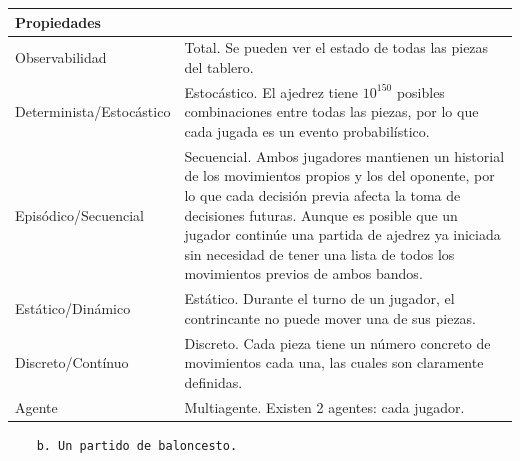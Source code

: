 \documentclass[11pt]{article}
\begin{document}
\begin{longtable}[]{@{}
  >{\raggedright\arraybackslash}p{}
  >{\raggedright\arraybackslash}p{}@{}}
\toprule\noalign{}
\begin{minipage}[b]{\linewidth}\raggedright
Propiedades
\end{minipage} & \begin{minipage}[b]{\linewidth}\raggedright
\end{minipage} \\
\midrule\noalign{}
\endhead
\bottomrule\noalign{}
\endlastfoot
Observabilidad & Total. Se pueden ver el estado de todas las piezas del
tablero. \\
Determinista/Estocástico & Estocástico. El ajedrez tiene \(10^{150}\)
posibles combinaciones entre todas las piezas, por lo que cada jugada es
un evento probabilístico. \\
Episódico/Secuencial & Secuencial. Ambos jugadores mantienen un
historial de los movimientos propios y los del oponente, por lo que cada
decisión previa afecta la toma de decisiones futuras. Aunque es posible
que un jugador continúe una partida de ajedrez ya iniciada sin necesidad
de tener una lista de todos los movimientos previos de ambos bandos. \\
Estático/Dinámico & Estático. Durante el turno de un jugador, el
contrincante no puede mover una de sus piezas. \\
Discreto/Contínuo & Discreto. Cada pieza tiene un número concreto de
movimientos cada una, las cuales son claramente definidas. \\
Agente & Multiagente. Existen 2 agentes: cada jugador. \\
\end{longtable}

\begin{verbatim}
    b. Un partido de baloncesto.
\end{verbatim}
\end{document}
